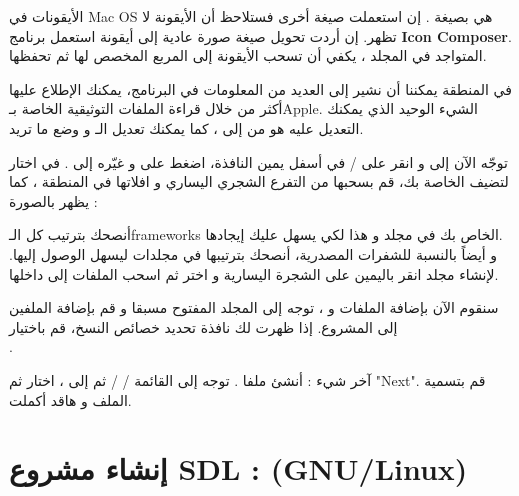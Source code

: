 \begin{information}
الأيقونات في
\textenglish{Mac OS}
هي بصيغة
.
إن استعملت صيغة أخرى فستلاحظ أن الأيقونة لا تظهر. إن أردت تحويل صيغة صورة عادية إلى أيقونة استعمل برنامج 
\textbf{\textenglish{Icon Composer}}.
المتواجد في المجلد
،
يكفي أن تسحب الأيقونة إلى المربع المخصص لها ثم تحفظها.
\end{information}

في المنطقة 
يمكننا أن نشير إلى العديد من المعلومات في البرنامج، يمكنك الإطلاع عليها أكثر من خلال قراءة الملفات التوثيقية الخاصة بـ\textenglish{Apple}.
الشيء الوحيد الذي يمكنك التعديل عليه هو 
من 
إلى 
،
كما يمكنك تعديل الـ
و وضع ما تريد.

توجّه الآن إلى 
و انقر على 
 / 
في أسفل يمين النافذة، اضغط على 
و غيّره إلى 
.
في 
اختار
لتضيف الخاصة بك، قم بسحبها من التفرع الشجري اليساري و افلاتها في المنطقة
،
كما يظهر بالصورة  :


أنصحك بترتيب كل الـ\textenglish{frameworks}
الخاص بك في مجلد 
و هذا لكي يسهل عليك إيجادها.\\
و أيضاً بالنسبة للشفرات المصدرية، أنصحك بترتيبها في مجلدات ليسهل الوصول إليها. لإنشاء مجلد انقر باليمين على الشجرة اليسارية و اختر
ثم اسحب الملفات إلى داخلها.

سنقوم الآن بإضافة الملفات
و 
،
توجه إلى المجلد 
المفتوح مسبقا و قم بإضافة الملفين إلى المشروع. إذا ظهرت لك نافذة تحديد خصائص النسخ، قم باختيار\\
.

آخر شيء : أنشئ ملفا
.
توجه إلى القائمة 
 /  / 
ثم إلى 
، 
اختار 
ثم
"\textenglish{Next}".
قم بتسمية الملف و هاقد أكملت.

\section{إنشاء مشروع \textenglish{SDL} : (\textenglish{GNU/Linux})}

